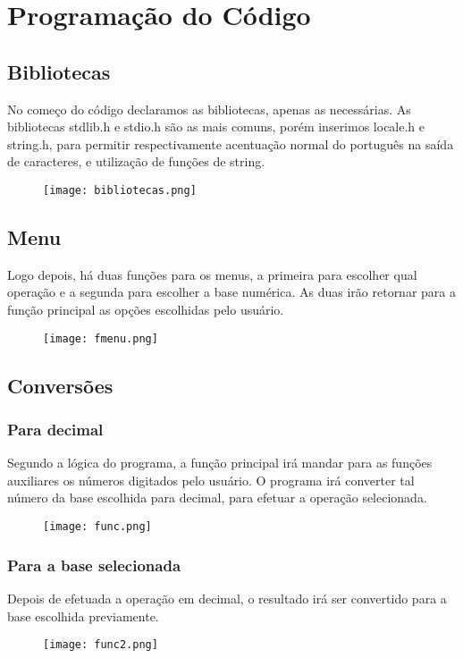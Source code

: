 \documentclass{article}
\begin{document}
 \section{Programação do Código}
 \subsection{Bibliotecas}
 No começo do código declaramos as bibliotecas, apenas as necessárias. As bibliotecas stdlib.h e stdio.h são as mais comuns, porém inserimos locale.h e string.h, para permitir respectivamente acentuação normal do português na saída de caracteres, e utilização de funções de string.
 \begin{center}
 \begin{figure}[h]
 \centering
 \texttt{[image: bibliotecas.png]}
 \end{figure}
 \end{center}
  \subsection{Menu}
  Logo depois, há duas funções para os menus, a primeira para escolher qual operação e a segunda para escolher a base numérica. As duas irão retornar para a função principal as opções escolhidas pelo usuário.
 \begin{center}
 \begin{figure}[h]
 \centering
 \texttt{[image: fmenu.png]}
 \end{figure}
 \end{center}
 \newpage
 
 \subsection{Conversões}
 \subsubsection{Para decimal}
 Segundo a lógica do programa, a função principal irá mandar para as funções auxiliares os números digitados pelo usuário. O programa irá converter tal número da base escolhida para decimal, para efetuar a operação selecionada. 
 \begin{center}
 \begin{figure}[h]
 \centering
 \texttt{[image: func.png]}
 \end{figure}
 \end{center}
 \subsubsection{Para a base selecionada}
 Depois de efetuada a operação em decimal, o resultado irá ser convertido para a base escolhida previamente. 
 \begin{center}
 \begin{figure}[h]
 \centering
 \texttt{[image: func2.png]}
 \end{figure}
 \end{center}
\end{document}
